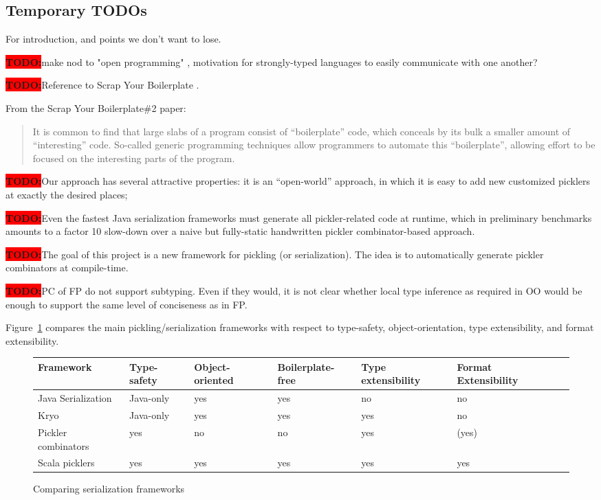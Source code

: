\documentclass[preprint,10pt]{sigplanconf}
\newcommand{\todo}{{\bf \colorbox{red}{\color{white}TODO:}}}
\begin{document}
\subsection{Temporary TODOs}

For introduction, and points we don't want to lose.

\todo make nod to "open programming" \cite{Rossberg2007}, motivation for strongly-typed languages to easily communicate with one another?

\todo Reference to Scrap Your Boilerplate \cite{Lammel2004}.

From the Scrap Your Boilerplate\#2 paper:
\begin{quote}
It is common to find that large slabs of a program consist of ``boilerplate'' code, which conceals by its bulk a smaller amount of ``interesting'' code. So-called generic programming techniques allow programmers to automate this ``boilerplate'', allowing effort to be focused on the interesting parts of the program.
\end{quote}

\todo Our approach has several attractive properties: it is an ``open-world'' approach, in which it is easy to add new customized picklers at exactly the desired places;

\todo Even the fastest Java serialization frameworks must generate all
pickler-related code at runtime, which in preliminary benchmarks
amounts to a factor 10 slow-down over a naive but fully-static handwritten pickler
combinator-based approach.

\todo The goal of this project is a new framework for pickling (or
serialization). The idea is to automatically generate pickler
combinators at compile-time.

\todo PC of FP do not support subtyping. Even if they would, it is not clear whether local type inference as required in OO would be enough to support the same level of conciseness as in FP.

Figure~\ref{fig:comparison} compares the main pickling/serialization
frameworks with respect to type-safety, object-orientation, type
extensibility, and format extensibility.

\begin{figure}[t]
\begin{tabular}{|l|l|l|l|l|l|l|}
\hline
Framework           & Type-safety  & Object-oriented  & Boilerplate-free  & Type extensibility  & Format Extensibility \\
\hline
Java Serialization  & Java-only    & yes              & yes          & no                  & no \\
Kryo                & Java-only    & yes              & yes          & yes                 & no \\
Pickler combinators & yes          & no               & no           & yes                 & (yes) \\
Scala picklers      & yes          & yes              & yes          & yes                 & yes \\
\hline
\end{tabular}

\caption{Comparing serialization frameworks}\label{fig:comparison}
\end{figure}
\end{document}
